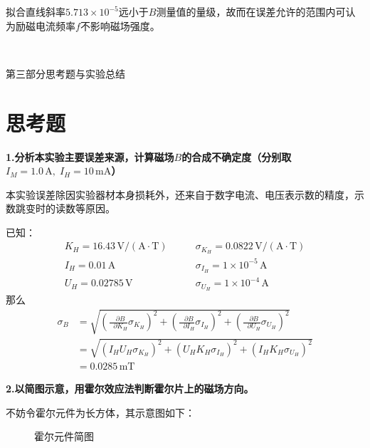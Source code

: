 \documentclass[UTF-8,twoside,cs4size]{ctexart}
\newcommand*{\mpar}{\mathop{}\!\partial}
\begin{document}
	拟合直线斜率$ 5.713\times10^{-5} $远小于$ B $测量值的量级，故而在误差允许的范围内可认为励磁电流频率$ f $不影响磁场强度。
	
	\newpage
	
	~\
	
	\begin{center}
		\Large\heiti 第三部分\quad 思考题与实验总结
	\end{center}
	\setcounter{section}{0}
	
	\section{思考题}
	\textbf{1.分析本实验主要误差来源，计算磁场$ B $的合成不确定度（分别取$ I_M=1.0\,\mathrm A,\;I_H=10\,\mathrm{mA} $）}
	
	{\kaishu 本实验误差除因实验器材本身损耗外，还来自于数字电流、电压表示数的精度，示数跳变时的读数等原因。
	
	已知：
	\begin{align*}
		K_H=16.43\,\mathrm{V/(A\cdot T)}\quad & \quad\sigma_{K_H}=0.0822\,\mathrm{V/(A\cdot T)}\\
		I_H=0.01\,\mathrm{A}\quad & \quad\sigma_{I_H}=1\times10^{-5}\,\mathrm{A}\\
		U_H=0.02785\,\mathrm{V}\quad & \quad\sigma_{U_H}=1\times10^{-4}\,\mathrm A
	\end{align*}
	那么
	\begin{align*}
		\sigma_B & =\sqrt{\left(\frac{\mpar B}{\mpar K_H}\sigma_{K_H}\right)^2+\left(\frac{\mpar B}{\mpar I_H}\sigma_{I_H}\right)^2+\left(\frac{\mpar B}{\mpar U_H}\sigma_{U_H}\right)^2}\\
		& =\sqrt{(I_HU_H\sigma_{K_H})^2+(U_HK_H\sigma_{I_H})^2+(I_HK_H\sigma_{U_H})^2}\\
		& =0.0285\,\mathrm{mT}
\end{align*}}

	\textbf{2.以简图示意，用霍尔效应法判断霍尔片上的磁场方向。}
	
	{\kaishu 不妨令霍尔元件为长方体，其示意图如下：}
	\begin{figure}[!h]
		\centering
		\caption{霍尔元件简图}
	\end{figure}
	
\end{document}
